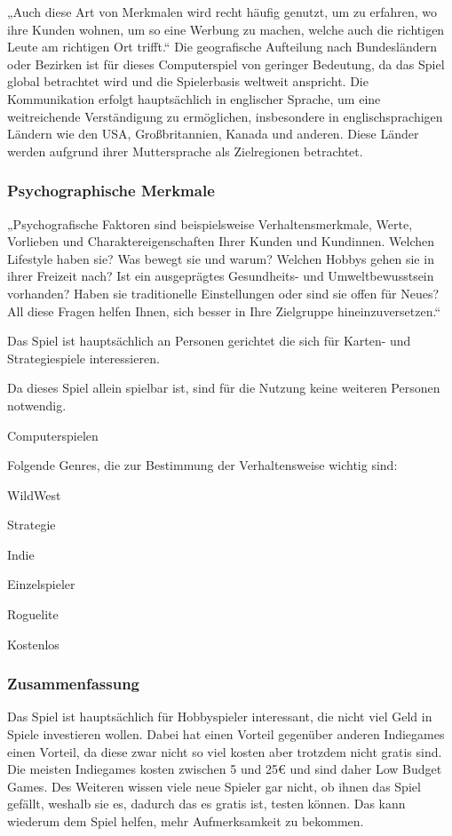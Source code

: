 „Auch diese Art von Merkmalen wird recht häufig genutzt, um zu erfahren, wo ihre Kunden wohnen, um so eine Werbung zu machen, welche auch die richtigen Leute am richtigen Ort trifft.“
Die geografische Aufteilung nach Bundesländern oder Bezirken ist für dieses Computerspiel von geringer Bedeutung, da das Spiel global betrachtet wird und die Spielerbasis weltweit anspricht.
Die Kommunikation erfolgt hauptsächlich in englischer Sprache, um eine weitreichende Verständigung zu ermöglichen, insbesondere in englischsprachigen Ländern wie den USA, Großbritannien, Kanada und anderen.
Diese Länder werden aufgrund ihrer Muttersprache als Zielregionen betrachtet.

\subsubsection{Psychographische Merkmale}\label{subsubsec:Psychographische-Merkmale}

„Psychografische Faktoren sind beispielsweise Verhaltensmerkmale, Werte, Vorlieben und Charaktereigenschaften Ihrer Kunden und Kundinnen. Welchen Lifestyle haben sie?
Was bewegt sie und warum? Welchen Hobbys gehen sie in ihrer Freizeit nach? Ist ein ausgeprägtes Gesundheits- und Umweltbewusstsein vorhanden? Haben sie traditionelle Einstellungen oder
sind sie offen für Neues? All diese Fragen helfen Ihnen, sich besser in Ihre Zielgruppe hineinzuversetzen.“ 

 Das Spiel ist hauptsächlich an Personen gerichtet die sich für Karten- und Strategiespiele interessieren.

 Da dieses Spiel allein spielbar ist, sind für die Nutzung keine weiteren Personen notwendig.

 Computerspielen

Folgende Genres, die zur Bestimmung der Verhaltensweise wichtig sind:
\begin{liste}
    \item WildWest
    \item Strategie
    \item Indie
    \item Einzelspieler
    \item Roguelite
    \item Kostenlos
\end{liste}


\subsubsection{Zusammenfassung}\label{subsubsec:Zusammenfassung}
Das Spiel ist hauptsächlich für Hobbyspieler interessant, die nicht viel Geld in Spiele investieren wollen. Dabei hat \ff einen Vorteil gegenüber anderen Indiegames einen Vorteil,
da diese zwar nicht so viel kosten aber trotzdem nicht gratis sind. Die meisten Indiegames kosten zwischen 5 und 25€ und sind daher Low Budget Games.
Des Weiteren wissen viele neue Spieler gar nicht, ob ihnen das Spiel gefällt, weshalb sie es, dadurch das es gratis ist, testen können. Das kann wiederum dem Spiel helfen, mehr Aufmerksamkeit zu bekommen.


\renewcommand{\kapitelautor}{}
